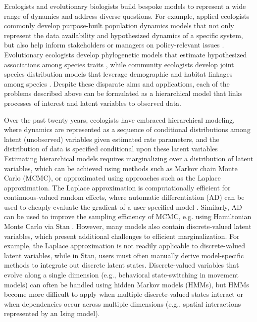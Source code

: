 \documentclass[11pt]{article}
\begin{document}
Ecologists and evolutionary biologists build bespoke models to represent a wide range of dynamics and address diverse questions. For example, applied ecologists commonly develop purpose-built population dynamics models that not only represent the data availability and hypothesized dynamics of a specific system, but also help inform stakeholders or managers on policy-relevant issues \citep{schaub_lessons_2024}.  Evolutionary ecologists develop phylogenetic models that estimate hypothesized associations among species traits \citep{harmon_phylogenetic_2018}, while community ecologists develop joint species distribution models that leverage demographic and habitat linkages among species \citep{sharma_no_2025}. Despite these disparate aims and applications, each of the problems described above can be formulated as a hierarchical model that links processes of interest and latent variables to observed data.

Over the past twenty years, ecologists have embraced hierarchical modeling, where dynamics are represented as a sequence of conditional distributions among latent (unobserved) variables given estimated rate parameters, and the distribution of data is  specified conditional upon these latent variables \citep{royle_hierarchical_2008}. Estimating hierarchical models requires marginalizing over a distribution of latent variables, which can be achieved using methods such as Markov chain Monte Carlo (MCMC), or approximated using approaches such as the Laplace approximation.  The Laplace approximation is computationally efficient for continuous-valued random effects, where automatic differentiation (AD) can be used to cheaply evaluate the gradient of a user-specified model \citep{skaug_automatic_2006}.  Similarly, AD can be used to improve the sampling efficiency of MCMC, e.g. using Hamiltonian Monte Carlo via Stan \citep{gelman_stan_2015}. However, many models also contain discrete-valued latent variables, which present additional challenges to efficient marginalization. For example, the Laplace approximation is not readily applicable to discrete-valued latent variables, while in Stan, users must often manually derive model-specific methods to integrate out discrete latent states. Discrete-valued variables that evolve along a single dimension (e.g., behavioral state-switching in movement models) can often be handled using hidden Markov models (HMMs), but HMMs become more difficult to apply when multiple discrete-valued states interact or when dependencies occur across multiple dimensions (e.g., spatial interactions represented by an Ising model). 
\end{document}

